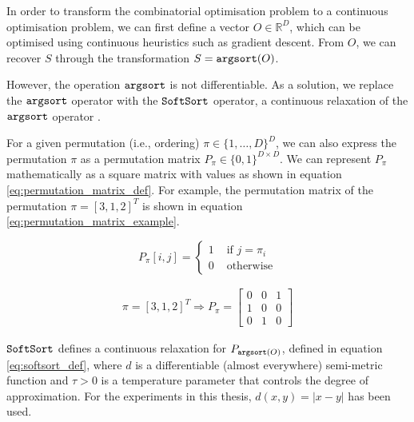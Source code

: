 In order to transform the combinatorial optimisation problem to a continuous optimisation problem, we can first define a vector $O\in \mathbb{R}^{D}$, which can be optimised using continuous heuristics such as gradient descent. From $O$, we can recover $S$ through the transformation $S = \operatorname*{\texttt{argsort}}(O)$.

However, the operation $\operatorname*{\texttt{argsort}}$ is not differentiable. As a solution, we replace the $\operatorname*{\texttt{argsort}}$ operator with the $\operatorname*{\texttt{SoftSort}}$ operator, a continuous relaxation of the $\operatorname*{\texttt{argsort}}$ operator \citep{prilloSoftSortContinuousRelaxation2020}.

For a given permutation (i.e., ordering) $\pi \in \{1, \ldots, D\}^D$, we can also express the permutation $\pi$ as a permutation matrix $P_{\pi} \in \{0,1\}^{D \times D}$. We can represent $P_{\pi}$ mathematically as a square matrix with values as shown in equation \ref{eq:permutation_matrix_def}. For example, the permutation matrix of the permutation $\pi = [3, 1, 2]^T$ is shown in equation \ref{eq:permutation_matrix_example}. 

\begin{equation} \label{eq:permutation_matrix_def}
	P_{\pi}[i,j] = \begin{cases}
		1 & \text{ if } j = \pi_i \\
		0 & \text{ otherwise}
	\end{cases}
\end{equation}

\begin{align} \label{eq:permutation_matrix_example}
	\pi = [3, 1, 2]^T \Longrightarrow	P_{\pi} = 
	\left[\begin{array}{lllll}
		0 & 0 & 1 \\
		1 & 0 & 0 \\
		0 & 1 & 0
	\end{array}\right]
\end{align}

$\operatorname*{\texttt{SoftSort}}$ defines a continuous relaxation for $P_{\operatorname*{\texttt{argsort}}(O)}$, defined in equation \ref{eq:softsort_def}, where $d$ is a differentiable (almost everywhere) semi-metric function and $\tau >0$ is a temperature parameter that controls the degree of approximation. For the experiments in this thesis, $d(x,y) = |x-y|$ has been used.

